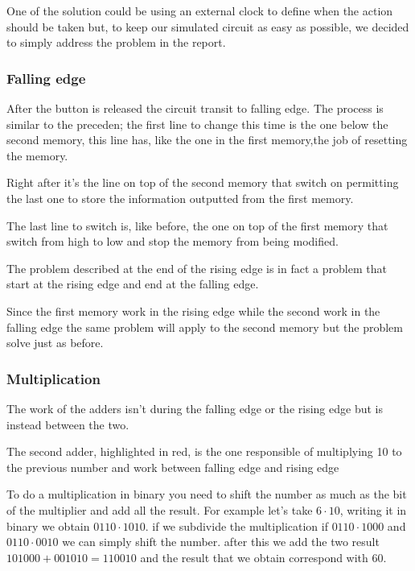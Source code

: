 \documentclass{article}
\begin{document}
One of the solution could be using an external clock to define when the action should be taken but, to keep our simulated circuit as easy as possible, we decided to simply address the problem in the report.


\subsubsection{Falling edge}

After the button is released the circuit transit to falling edge.
The process is similar to the preceden; the first line to change this time is the one below the second memory, this line has, like the one in the first memory,the job of resetting the memory.

Right after it's the line on top of the second memory that switch on permitting the last one to store the information outputted from the first memory.

The last line to switch is, like before, the one on top of the first memory that switch from high to low and stop the memory from being modified.

\vspace{3mm}

The problem described at the end of the rising edge is in fact a problem that start at the rising edge and end at the falling edge. 

Since the first memory work in the rising edge while the second work in the falling edge the same problem will apply to the second memory but the problem solve just as before.


\subsubsection{Multiplication}

The work of the adders isn't during the falling edge or the rising edge but is instead  between the two.

\vspace{3mm}

The second adder, highlighted in red, is the one responsible of multiplying 10 to the previous number and work between falling edge and rising edge

To do a multiplication in binary you need to shift the number as much as the bit of the multiplier and add all the result. For example let's take $6 \cdot 10$, writing it in binary we obtain 
$0110 \cdot 1010$. if we subdivide the multiplication if $0110 \cdot 1000$ and $0110 \cdot 0010$ we can simply shift the number. 
after this we add the two result $101000 + 001010 = 110010$ and the result that we obtain correspond with 60.
\end{document}

